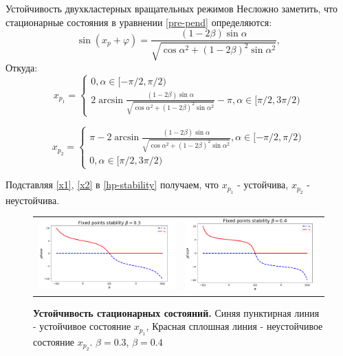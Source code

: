 \begin{chapter}{Устойчивость двухкластерных вращательных режимов}
	Несложно заметить, что стационарные состояния в уравнении \ref{pre-pend} определяются:
	$$
	\sin{(x_p + \varphi)} = \frac{(1 - 2\beta) \sin{\alpha}}{\sqrt{\cos{\alpha}^2 + (1 - 2\beta)^2\sin{\alpha}^2}},
	$$
	Откуда:
	\begin{equation} \label{x1}
		x_{p_1} = \begin{cases}
			0, \alpha \in [-\pi/2, \pi/2) \\
			2\arcsin{\frac{(1 - 2\beta) \sin{\alpha}}{\sqrt{\cos{\alpha}^2 + (1 - 2\beta)^2\sin{\alpha}^2}}} - \pi , \alpha \in [\pi/2, 3\pi/2)
		\end{cases}
	\end{equation}
	
	\begin{equation} \label{x2}
	x_{p_2} = \begin{cases}
		\pi - 2\arcsin{\frac{(1 - 2\beta) \sin{\alpha}}{\sqrt{\cos{\alpha}^2 + (1 - 2\beta)^2\sin{\alpha}^2}}}, \alpha \in [-\pi/2, \pi/2) \\
		0, \alpha \in [\pi/2, 3\pi/2)
		\end{cases}
	\end{equation}
	
	Подставляя \ref{x1}, \ref{x2} в \ref{hp-stability}
	получаем, что $x_{p_1}$ - устойчива, $x_{p_2}$ - неустойчива.

	\begin{figure}[h!]\center
		\begin{tabular}{cc}
		\includegraphics[width=0.54\columnwidth]{pictures/fixed-points.png}
		&
		\includegraphics[width=0.5\columnwidth]{pictures/fixed-points-2.png} 
		\end{tabular}
		\caption{\textbf{Устойчивость стационарных состояний.}
		Синяя пунктирная линия - устойчивое состояние $x_{p_1}$,
		Красная сплошная линия - неустойчивое состояние $x_{p_2}$.
		$\beta = 0.3$, $\beta = 0.4$}
	\end{figure}


\end{chapter}
